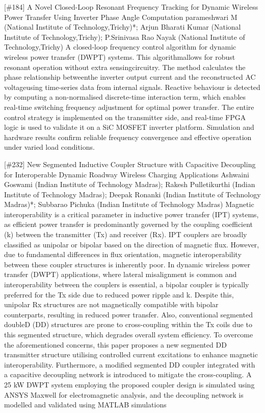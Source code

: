 {} \begin{abstract_online} {[\#184] A Novel Closed-Loop Resonant Frequency Tracking for Dynamic Wireless Power Transfer Using Inverter Phase Angle Computation} {} {parameshwari M (National Institute of Technology,Trichy)*; Arjun Bharati  Kumar (National Institute of Technology,Trichy); P.Srinivasa Rao  Nayak (National Institute of Technology,Trichy)} {} A closed-loop frequency control algorithm for dynamic wireless power transfer (DWPT) systems. This algorithmallows for robust resonant operation without extra sensingcircuitry. The method calculates the phase relationship betweenthe inverter output current and the reconstructed AC voltageusing time-series data from internal signals. Reactive behaviour is detected by computing a non-normalised discrete-time interaction term, which enables real-time switching frequency adjustment for optimal power transfer. The entire control strategy is implemented on the transmitter side, and real-time FPGA logic is used to validate it on a SiC MOSFET inverter platform. Simulation and hardware results confirm reliable frequency convergence and effective operation under varied load conditions. \end{abstract_online} 
{} \begin{abstract_online} {[\#232] New Segmented Inductive Coupler Structure with Capacitive Decoupling for Interoperable Dynamic Roadway Wireless Charging Applications} {} {Ashwaini Goswami (Indian Institute of Technology Madras); Rakesh Pulletikurthi (Indian Institute of Technology Madras); Deepak  Ronanki (Indian Institute of Technology Madras)*; Subbarao Pichuka (Indian Institute of Technology Madras)} {} Magnetic interoperability is a critical parameter in inductive power transfer (IPT) systems, as efficient power transfer is predominantly governed by the coupling coefficient (k) between the transmitter (Tx) and receiver (Rx). IPT couplers are broadly classified as unipolar or bipolar based on the direction of magnetic flux. However, due to fundamental differences in flux orientation, magnetic interoperability between these coupler structures is inherently poor. In dynamic wireless power transfer (DWPT) applications, where lateral misalignment is common and interoperability between the couplers is essential, a bipolar coupler is typically preferred for the Tx side due to reduced power ripple and k. Despite this, unipolar Rx structures are not magnetically compatible with bipolar counterparts, resulting in reduced power transfer. Also, conventional segmented doubleD (DD) structures are prone to cross-coupling within the Tx coils due to this segmented structure, which degrades overall system efficiency. To overcome the aforementioned concerns, this paper proposes a new segmented DD transmitter structure utilising controlled current excitations to enhance magnetic interoperability. Furthermore, a modified segmented DD coupler integrated with a capacitive decoupling network is introduced to mitigate the cross-coupling. A 25 kW DWPT system employing the proposed coupler design is simulated using ANSYS Maxwell for electromagnetic analysis, and the decoupling network is modelled and validated using MATLAB simulations \end{abstract_online} 
